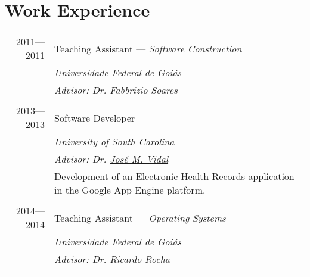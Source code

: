 \documentclass[a4paper,10pt]{article}
\begin{document}
\section{Work Experience}
\begin{tabular}{r|p{11cm}}

  \textsc{2011---2011}
  & Teaching Assistant --- \emph{Software Construction}\\
  &\emph{Universidade Federal de Goiás}\\
  &\emph{Advisor: Dr. Fabbrizio Soares}
  \\\multicolumn{2}{c}{} \\

  \textsc{2013---2013}
  & Software Developer\\
  &\emph{University of South Carolina}\\
  &\emph{Advisor: Dr. \href{http://jmvidal.cse.sc.edu}{José M. Vidal}}\\
  &\footnotesize{Development of an Electronic Health Records application in the Google App Engine platform.}
  \\\multicolumn{2}{c}{} \\

  \textsc{2014---2014}
  & Teaching Assistant --- \emph{Operating Systems}\\
  &\emph{Universidade Federal de Goiás}\\
  &\emph{Advisor: Dr. Ricardo Rocha}
  \\\multicolumn{2}{c}{} \\

\end{tabular}
\end{document}
